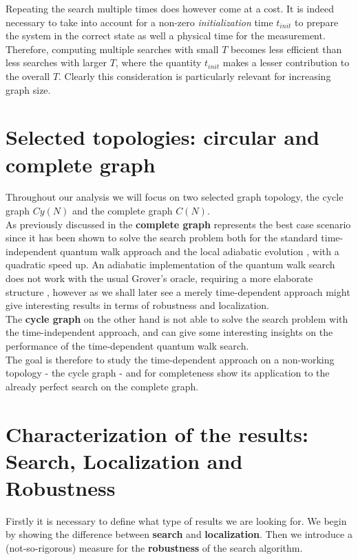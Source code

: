         Repeating the search multiple times does however come at a cost. It is indeed necessary to take into account for a non-zero \textit{initialization} time $t_{init}$ to prepare the system in the correct state as well a physical time for the measurement. Therefore, computing multiple searches with small $T$ becomes less efficient than less searches with larger $T$, where the quantity $t_{init}$ makes a lesser contribution to the overall $T$. Clearly this consideration is particularly relevant for increasing graph size.

\clearpage
\section{Selected topologies: circular and complete graph}
    Throughout our analysis we will focus on two selected graph topology, the cycle graph $Cy(N)$ and the complete graph $C(N)$. \\

    As previously discussed in  the \textbf{complete graph} represents the best case scenario since it has been shown to solve the search problem both for the standard time-independent quantum walk approach \cite{Childs2004} and the local adiabatic evolution \cite{Roland2002}, with a quadratic speed up. An adiabatic implementation of the quantum walk search does not work with the usual Grover's oracle, requiring a more elaborate structure \cite{Wong2016}, however as we shall later see a merely time-dependent approach might give interesting results in terms of robustness and localization.  \\

    The \textbf{cycle graph} on the other hand is not able to solve the search problem with the time-independent approach, and can give some interesting insights on the performance of the time-dependent quantum walk search.  \\
    The goal is therefore to study the time-dependent approach on a non-working topology - the cycle graph - and for completeness show its application to the already perfect search on the complete graph.

\section{Characterization of the results: Search, Localization and Robustness}
    Firstly it is necessary to define what type of results we are looking for. We begin by showing the difference between \textbf{search} and \textbf{localization}. Then we introduce a (not-so-rigorous) measure for the \textbf{robustness} of the search algorithm.

